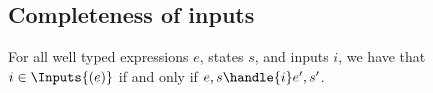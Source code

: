 \subsection{Completeness of inputs}

\begin{theorem}
  For all well typed expressions $e$, states $s$, and inputs $i$,
  we have that $i \in \Inputs{(e)}$ if and only if $e,s \handle{i} e',s'$.
  \label{thm:safety-i}
\end{theorem}
